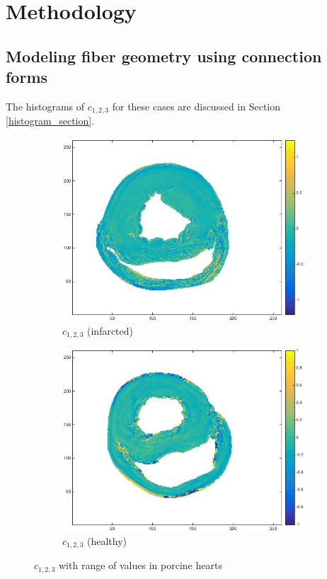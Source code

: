 \chapter{Methodology}

\section{Modeling fiber geometry using connection forms}

The histograms of $c_{1,2,3}$ for these cases are discussed in Section \ref{histogram_section}.

\begin{figure}[h!]
    \centering
    \begin{subfigure}[h!]{0.48\textwidth}
        \centering
        \includegraphics[width=\textwidth]{figures/pig4_c123_slice_19}
        \caption{$c_{1,2,3}$ (infarcted)}
        \label{fig:c123infarcted}
    \end{subfigure}
    \hfill
    \begin{subfigure}[h!]{0.48\textwidth}
        \centering
        \includegraphics[width=\textwidth]{figures/pig25_c123_slice_30}
        \caption{$c_{1,2,3}$ (healthy)}
        \label{fig:c123healthy}
    \end{subfigure}
    \caption{$c_{1,2,3}$ with range of values in porcine hearts}
    \label{fig:c123all}
\end{figure}

